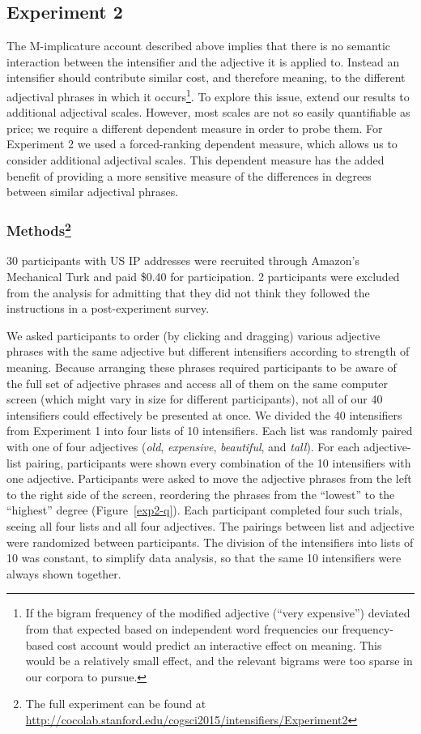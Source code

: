 \documentclass[10pt,letterpaper]{article}
\newcommand{\w}[1]{\emph{#1}}
\begin{document}
\subsection{Experiment 2}

The M-implicature account described above implies that there is no semantic interaction between the intensifier and the adjective it is applied to. Instead an intensifier should contribute similar cost, and therefore meaning, to the different adjectival phrases in which it occurs\footnote{If the bigram frequency of the modified adjective (``very expensive'') deviated from that expected based on independent word frequencies our frequency-based cost account would predict an interactive effect on meaning. This would be a relatively small effect, and the relevant bigrams were too sparse in our corpora to pursue.}.
To explore this issue, extend our results to additional adjectival scales. However, most scales are not so easily quantifiable as price; we require a different dependent measure in order to probe them.
For Experiment 2 we used a forced-ranking dependent measure, which allows us to consider additional adjectival scales. This dependent measure has the added benefit of providing a more sensitive measure of the differences in degrees between similar adjectival phrases.

\subsubsection{Methods\footnote{The full experiment can be found at \url{http://cocolab.stanford.edu/cogsci2015/intensifiers/Experiment2}}}

30 participants with US IP addresses were recruited through Amazon's Mechanical Turk and paid \$0.40 for  participation. 2 participants were excluded from the analysis for admitting that they did not think they followed the instructions in a post-experiment survey.

We asked participants to order (by clicking and dragging) various adjective phrases with the same adjective but different intensifiers according to strength of meaning. Because arranging these phrases required participants to be aware of the full set of adjective phrases and access all of them on the same computer screen (which might vary in size for different participants), not all of our 40 intensifiers could effectively be presented at once. We divided the 40 intensifiers from Experiment 1 into four lists of 10 intensifiers. 
Each list was randomly paired with one of four adjectives (\w{old}, \w{expensive}, \w{beautiful}, and \w{tall}).
For each adjective-list pairing, participants were shown every combination of the 10 intensifiers with one adjective.
Participants were asked to move the adjective phrases from the left to the right side of the screen, reordering the phrases from the ``lowest'' to the ``highest'' degree (Figure~\ref{exp2-q}).
Each participant completed four such trials, seeing all four lists and all four adjectives.
The pairings between list and adjective were randomized between participants.
The division of the intensifiers into lists of 10 was constant, to simplify data analysis, so that the same 10 intensifiers were always shown together.
\end{document}
